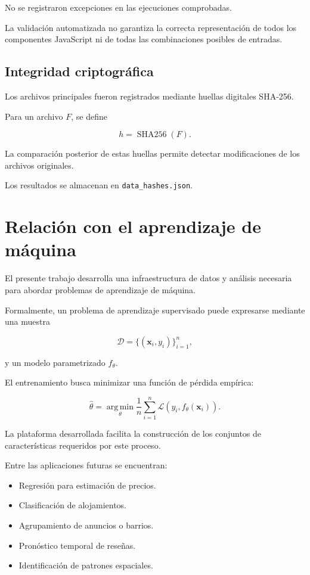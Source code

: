 \documentclass[11pt,a4paper]{article}
\begin{document}
No se registraron excepciones en las ejecuciones
comprobadas.

La validación automatizada no garantiza la correcta
representación de todos los componentes JavaScript
ni de todas las combinaciones posibles de entradas.

\subsection{Integridad criptográfica}

Los archivos principales fueron registrados mediante
huellas digitales SHA-256.

Para un archivo $F$, se define

\[
h=\operatorname{SHA256}(F).
\]

La comparación posterior de estas huellas permite
detectar modificaciones de los archivos originales.

Los resultados se almacenan en
\texttt{data\_hashes.json}.


\section{Relación con el aprendizaje de máquina}

El presente trabajo desarrolla una infraestructura
de datos y análisis necesaria para abordar
problemas de aprendizaje de máquina.

Formalmente, un problema de aprendizaje supervisado
puede expresarse mediante una muestra

\[
\mathcal{D}=
\{(\mathbf{x}_i,y_i)\}_{i=1}^{n},
\]

y un modelo parametrizado $f_{\theta}$.

El entrenamiento busca minimizar una función
de pérdida empírica:

\[
\widehat{\theta}
=
\operatorname*{arg\,min}_{\theta}
\frac{1}{n}
\sum_{i=1}^{n}
\mathcal{L}
\left(
y_i,f_{\theta}(\mathbf{x}_i)
\right).
\]

La plataforma desarrollada facilita la construcción
de los conjuntos de características requeridos
por este proceso.

Entre las aplicaciones futuras se encuentran:

\begin{itemize}
    \item Regresión para estimación de precios.
    \item Clasificación de alojamientos.
    \item Agrupamiento de anuncios o barrios.
    \item Pronóstico temporal de reseñas.
    \item Identificación de patrones espaciales.
\end{itemize}
\end{document}
